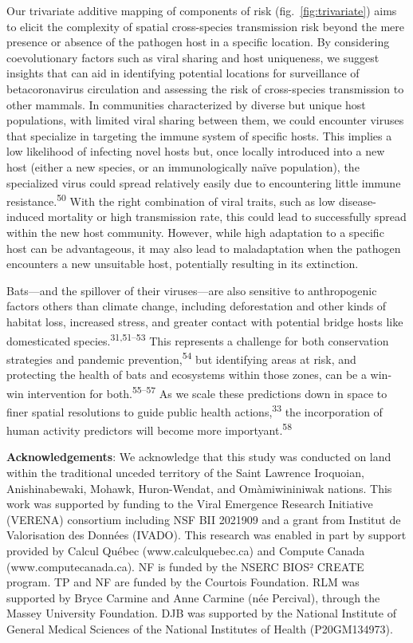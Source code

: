 \documentclass[10pt,oneside]{article}
\begin{document}
Our trivariate additive mapping of components of risk
(fig.~\ref{fig:trivariate}) aims to elicit the complexity of spatial
cross-species transmission risk beyond the mere presence or absence of
the pathogen host in a specific location. By considering coevolutionary
factors such as viral sharing and host uniqueness, we suggest insights
that can aid in identifying potential locations for surveillance of
betacoronavirus circulation and assessing the risk of cross-species
transmission to other mammals. In communities characterized by diverse
but unique host populations, with limited viral sharing between them, we
could encounter viruses that specialize in targeting the immune system
of specific hosts. This implies a low likelihood of infecting novel
hosts but, once locally introduced into a new host (either a new
species, or an immunologically naïve population), the specialized virus
could spread relatively easily due to encountering little immune
resistance.\textsuperscript{50} With the right combination of viral
traits, such as low disease-induced mortality or high transmission rate,
this could lead to successfully spread within the new host community.
However, while high adaptation to a specific host can be advantageous,
it may also lead to maladaptation when the pathogen encounters a new
unsuitable host, potentially resulting in its extinction.

Bats---and the spillover of their viruses---are also sensitive to
anthropogenic factors others than climate change, including
deforestation and other kinds of habitat loss, increased stress, and
greater contact with potential bridge hosts like domesticated
species.\textsuperscript{31,51--53} This represents a challenge for both
conservation strategies and pandemic prevention,\textsuperscript{54} but
identifying areas at risk, and protecting the health of bats and
ecosystems within those zones, can be a win-win intervention for
both.\textsuperscript{55--57} As we scale these predictions down in
space to finer spatial resolutions to guide public health
actions,\textsuperscript{33} the incorporation of human activity
predictors will become more importyant.\textsuperscript{58}

\textbf{Acknowledgements}: We acknowledge that this study was conducted
on land within the traditional unceded territory of the Saint Lawrence
Iroquoian, Anishinabewaki, Mohawk, Huron-Wendat, and Omàmiwininiwak
nations. This work was supported by funding to the Viral Emergence
Research Initiative (VERENA) consortium including NSF BII 2021909 and a
grant from Institut de Valorisation des Données (IVADO). This research
was enabled in part by support provided by Calcul Québec
(www.calculquebec.ca) and Compute Canada (www.computecanada.ca). NF is
funded by the NSERC BIOS² CREATE program. TP and NF are funded by the
Courtois Foundation. RLM was supported by Bryce Carmine and Anne Carmine
(née Percival), through the Massey University Foundation. DJB was
supported by the National Institute of General Medical Sciences of the
National Institutes of Health (P20GM134973).
\end{document}
